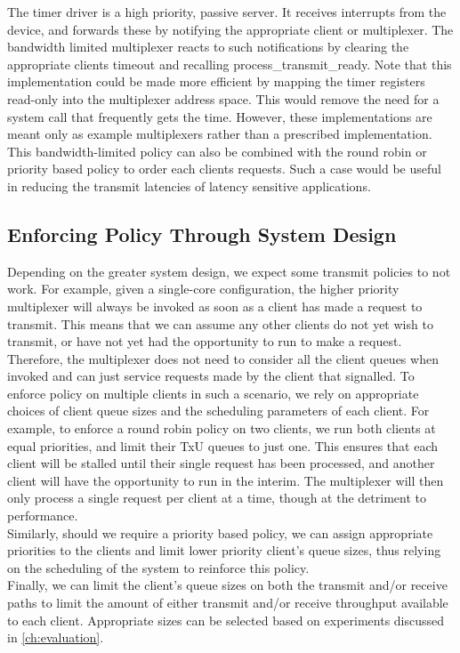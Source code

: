 The timer driver is a high priority, passive server. It receives interrupts from the device,
and forwards these by notifying the appropriate client or multiplexer. The bandwidth limited
multiplexer reacts to such notifications by clearing the appropriate clients timeout and
recalling process\_transmit\_ready. Note that this implementation could be made more efficient
by mapping the timer registers read-only into the multiplexer address space. This would remove
the need for a system call that frequently gets the time. However, these implementations are 
meant only as example multiplexers rather than a prescribed implementation. \\

This bandwidth-limited policy can also be combined with the round robin or priority based policy
to order each clients requests. Such a case would be useful in reducing the 
transmit latencies of latency sensitive applications.\\ 


\subsection{Enforcing Policy Through System Design}
Depending on the greater system design, we expect some transmit policies to not work.
For example, given a single-core configuration, the higher priority multiplexer will
always be invoked as soon as a client has made a request to transmit. This means that
we can assume any other clients do not yet wish to transmit, or have not yet had the
opportunity to run to make a request. Therefore, the multiplexer does not need to 
consider all the client queues when invoked and can just service requests made
by the client that signalled. To enforce policy on multiple clients in such a scenario,
we rely on appropriate choices of client queue sizes and the scheduling parameters
of each client. For example, to enforce a round robin policy on two clients, we run both clients
at equal priorities, and limit their TxU queues to just one. This ensures
that each client will be stalled until their single request has been processed, and
another client will have the opportunity to run in the interim. The multiplexer will
then only process a single request per client at a time, though at the detriment to performance.\\
Similarly, should we require a priority based policy, we can assign appropriate priorities
to the clients and limit lower priority client's queue sizes, thus relying on the scheduling
of the system to reinforce this policy.\\
Finally, we can limit the client's queue sizes on both the transmit and/or receive paths
to limit the amount of either transmit and/or receive throughput available to each client.
Appropriate sizes can be selected based on experiments discussed in \autoref{ch:evaluation}.\\ 

